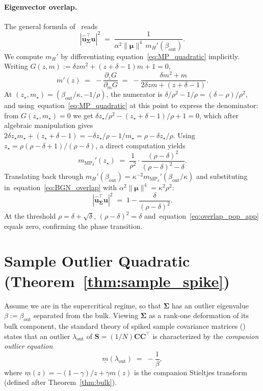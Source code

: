 \documentclass{article}
\def\eqref#1{equation~\ref{#1}}
\def\vmu{{\bm{\mu}}}
\def\vu{{\bm{u}}}
\def\mC{{\bm{C}}}
\def\mS{{\bm{S}}}
\def\mSigma{{\bm{\Sigma}}}
\begin{document}
\paragraph{Eigenvector overlap.}
The general formula of~\citet{benaych2011eigenvalues} reads
\begin{equation}\label{eq:BGN_overlap}
    |\hat\vu_\mSigma^\top\vu|^2 \;=\; \frac{1}{\alpha^2\|\vmu\|^4\, m_H'(\beta_\mathrm{out})}.
\end{equation}
We compute $m_H'$ by differentiating \eqref{eq:MP_quadratic} implicitly. Writing $G(z,m):=\delta z m^2+(z+\delta-1)m+1=0$,
\[
    m'(z) \;=\; -\frac{\partial_z G}{\partial_m G}
    \;=\; -\frac{\delta m^2 + m}{2\delta z m + (z+\delta-1)}.
\]
At $(z_\star,m_\star)=(\beta_\mathrm{out}/\kappa, -1/\rho)$, the numerator is $\delta/\rho^2 - 1/\rho = (\delta-\rho)/\rho^2$, and using~\eqref{eq:MP_quadratic} at this point to express the denominator: from $G(z_\star,m_\star)=0$ we get $\delta z_\star/\rho^2 - (z_\star+\delta-1)/\rho + 1 = 0$, which after algebraic manipulation gives $2\delta z_\star m_\star + (z_\star+\delta-1) = -\delta z_\star/\rho - 1/m_\star = \rho - \delta z_\star/\rho$. Using $z_\star=\rho(\rho-\delta+1)/(\rho-\delta)$, a direct computation yields
\[
    m_{\mathrm{MP}_\delta}'(z_\star) \;=\; \frac{1}{\rho^2}\cdot \frac{(\rho-\delta)^2}{(\rho-\delta)^2-\delta}.
\]
Translating back through $m_H'(\beta_\mathrm{out}) = \kappa^{-2} m_{\mathrm{MP}_\delta}'(\beta_\mathrm{out}/\kappa)$ and substituting in~\eqref{eq:BGN_overlap} with $\alpha^2\|\vmu\|^4=\kappa^2\rho^2$:
\begin{equation}\label{eq:overlap_pop_app}
    |\hat\vu_\mSigma^\top\vu|^2 \;=\; 1 - \frac{\delta}{(\rho-\delta)^2}.
\end{equation}
At the threshold $\rho=\delta+\sqrt\delta$, $(\rho-\delta)^2=\delta$ and~\eqref{eq:overlap_pop_app} equals zero, confirming the phase transition.


\section{Sample Outlier Quadratic (Theorem~\ref{thm:sample_spike})}\label{app:sample_spike}

Assume we are in the supercritical regime, so that $\mSigma$ has an outlier eigenvalue $\beta:=\beta_\mathrm{out}$ separated from the bulk. Viewing $\mSigma$ as a rank-one deformation of its bulk component, the standard theory of spiked sample covariance matrices (\citealp{silverstein1995empirical,bai2010spectral,benaych2011eigenvalues}) states that an outlier $\lambda_\mathrm{out}$ of $\mS=(1/N)\mC\mC^\top$ is characterized by the \emph{companion outlier equation}
\begin{equation}\label{eq:outlier_eq_app}
    \underline{m}(\lambda_\mathrm{out}) \;=\; -\frac{1}{\beta},
\end{equation}
where $\underline{m}(z) = -(1-\gamma)/z + \gamma m(z)$ is the companion Stieltjes transform (defined after Theorem~\ref{thm:bulk}).
\end{document}
